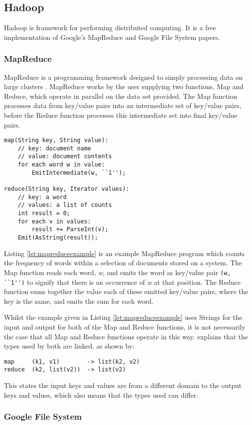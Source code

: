 \subsection{Hadoop}
Hadoop is framework for performing distributed computing. It is a free implementation of Google's MapReduce and Google File System papers.

\subsubsection{MapReduce}
MapReduce is a programming framework designed to simply processing data on large clusters \cite{mapreduce}. MapReduce works by the user supplying two functions, Map and Reduce, which operate in parallel on the data set provided. The Map function processes data from key/value pairs into an intermediate set of key/value pairs, before the Reduce function processes this intermediate set into final key/value pairs.

\begin{lstlisting}[float]
map(String key, String value):
	// key: document name
	// value: document contents
	for each word w in value:
		EmitIntermediate(w, ``1'');
		
reduce(String key, Iterator values):
	// key: a word
	// values: a list of counts
	int result = 0;
	for each v in values:
		result += ParseInt(v);
	Emit(AsString(result));	
\end{lstlisting}

Listing \ref{lst:mapreduceexample} is an example MapReduce program which counts the frequency of words within a selection of documents stored on a system. The Map function reads each word, \emph{w}, and emits the word as key/value pair \verb/(w, ``1'')/ to signify that there is an occurrence of \emph{w} at that position. The Reduce function sums together the value each of these emitted key/value pairs, where the key is the same, and emits the sum for each word.

Whilst the example given in Listing \ref{lst:mapreduceexample} uses Strings for the input and output for both of the Map and Reduce functions, it is not necessarily the case that all Map and Reduce functions operate in this way. \cite{mapreduce} explains that the types used by both are linked, as shown by:

\begin{verbatim}
map     (k1, v1)        -> list(k2, v2)
reduce  (k2, list(v2))  -> list(v2)
\end{verbatim}

This states the input keys and values are from a different domain to the output keys and values, which also means that the types used can differ.

\subsubsection{Google File System}

